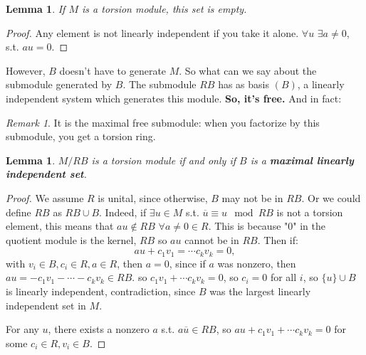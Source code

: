 \documentclass[12pt]{amsbook}
\theoremstyle{plain}
\numberwithin{section}{chapter}
\numberwithin{equation}{chapter}
\newtheorem{lem}[theorem]{Lemma}
\theoremstyle{definition}
\theoremstyle{remark}
\newtheorem{rem}[theorem]{Remark}
\renewcommand{\bar}{\overline}%
\begin{document}
\begin{lem}
If $M$ is a torsion module, this set is empty. 
\end{lem}

\begin{proof}
Any element is not linearly independent if you take it alone. $\forall u$ $\exists a \neq 0$, s.t. $au = 0$. 
\end{proof}

However, $B$ doesn't have to generate $M$. So what can we say about the submodule generated by $B$. The submodule $RB$ has as basis $(B)$, a linearly independent system which generates this module. \textbf{So, it's free. } And in fact: 

\begin{rem}
It is the maximal free submodule: when you factorize by this submodule, you get a torsion ring. 
\end{rem}

\begin{lem}
$M/RB$ is a torsion module if and only if $B$ is a \textbf{maximal linearly independent set}. 
\end{lem}
\begin{proof}
We assume $R$ is unital, since otherwise, $B$ may not be in $RB$. Or we could define $RB$ as $RB \cup B$. 
Indeed, if $\exists u \in M$ s.t. $\overline{u} \equiv u \mod RB$ is not a torsion element, this means that $au \notin RB$ $\forall a \neq 0 \in R$. This is because "0" in the quotient module is the kernel, $RB$ so $au$ cannot be in $RB$. Then if: 
$$
au + c_1v_1 = \cdots c_kv_k = 0,
$$
 with $v_i \in B, c_i \in R, a \in R$, then $a = 0$, since if $a$ was nonzero, then $au = -c_1v_1 - \cdots - c_kv_k \in RB$. so $c_1v_1 + \cdots c_kv_k = 0$, so $c_i = 0$ for all $i$, so $\{u\}\cup B$ is linearly independent, contradiction, since $B$ was the largest linearly independent set in $M$. 
 
 For any $u$, there exists a nonzero $a$ s.t. $a\bar{u} \in RB$, so $au + c_1v_1 + \cdots c_kv_k = 0$ for some $c_i \in R,v_i \in B$. 
\end{proof}
\end{document}
